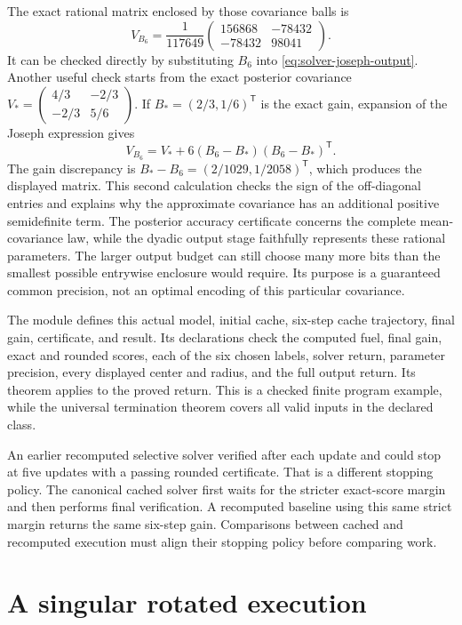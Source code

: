 The exact rational matrix enclosed by those covariance balls is
\[
 V_{B_6}=\frac{1}{117649}
 \begin{pmatrix}156868&-78432\\-78432&98041\end{pmatrix}.
\]
It can be checked directly by substituting $B_6$ into
\eqref{eq:solver-joseph-output}. Another useful check starts from the exact
posterior covariance
$V_* = \left(\begin{smallmatrix}4/3&-2/3\\-2/3&5/6\end{smallmatrix}\right)$.
If $B_*=(2/3,1/6)^{\mathsf T}$ is the exact gain, expansion of the Joseph
expression gives
\[
 V_{B_6}=V_*+6(B_6-B_*)(B_6-B_*)^{\mathsf T}.
\]
The gain discrepancy is
$B_*-B_6=(2/1029,1/2058)^{\mathsf T}$, which produces the displayed matrix.
This second calculation checks the sign of the off-diagonal entries and explains
why the approximate covariance has an additional positive semidefinite term.
The posterior accuracy certificate concerns the complete mean-covariance law,
while the dyadic output stage faithfully represents these rational parameters.
The larger output budget can still choose many more bits than the smallest
possible entrywise enclosure would require. Its purpose is a guaranteed common
precision, not an optimal encoding of this particular covariance.

The module  defines this actual model,
initial cache, six-step cache trajectory, final gain, certificate, and result.
Its declarations check the computed fuel, final gain, exact and rounded scores,
each of the six chosen labels, solver return, parameter precision, every displayed
center and radius, and the full output return. Its theorem 
applies  to the proved return. This is a checked finite
program example, while the universal termination theorem covers all valid inputs
in the declared class.

An earlier recomputed selective solver verified after each update and could stop
at five updates with a passing rounded certificate. That is a different stopping
policy. The canonical cached solver first waits for the stricter exact-score
margin and then performs final verification. A recomputed baseline using this
same strict margin returns the same six-step gain. Comparisons between cached and
recomputed execution must align their stopping policy before comparing work.

\section{A singular rotated execution}
\label{sec:solver-rotated}

